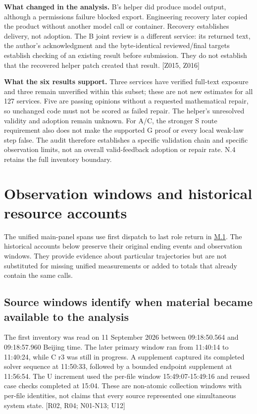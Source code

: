 \textbf{What changed in the analysis.} B's helper did produce model output, although a permissions failure blocked export. Engineering recovery later copied the product without another model call or container. Recovery establishes delivery, not adoption. The B joint review is a different service: its returned text, the author's acknowledgment and the byte-identical reviewed/final targets establish checking of an existing result before submission. They do not establish that the recovered helper patch created that result. [Z015, Z016]

\textbf{What the six results support.} Three services have verified full-text exposure and three remain unverified within this subset; these are not new estimates for all 127 services. Five are passing opinions without a requested mathematical repair, so unchanged code must not be scored as failed repair. The helper's unresolved validity and adoption remain unknown. For A/C, the stronger S route requirement also does not make the supported G proof or every local weak-law step false. The audit therefore establishes a specific validation chain and specific observation limits, not an overall valid-feedback adoption or repair rate. N.4 retains the full inventory boundary.

\section[Observation windows and historical resource accounts]{\texorpdfstring{\protect\hypertarget{appendix-h}{}Observation windows and historical resource accounts}{Observation windows and historical resource accounts}}
The unified main-panel spans use first dispatch to last role return in \hyperlink{m1}{M.1}. The historical accounts below preserve their original ending events and observation windows. They provide evidence about particular trajectories but are not substituted for missing unified measurements or added to totals that already contain the same calls.

\subsection[Source windows identify when material became available to the analysis]{\texorpdfstring{\protect\hypertarget{h1}{}Source windows identify when material became available to the analysis}{Source windows identify when material became available to the analysis}}
The first inventory was read on 11 September 2026 between 09:18:50.564 and 09:18:57.960 Beijing time. The later primary window ran from 11:40:14 to 11:40:24, while C r3 was still in progress. A supplement captured its completed solver sequence at 11:50:33, followed by a bounded endpoint supplement at 11:56:54. The U increment used the per-file window 15:49:07-15:49:16 and reused case checks completed at 15:04. These are non-atomic collection windows with per-file identities, not claims that every source represented one simultaneous system state. [R02, R04; N01-N13; U12]

